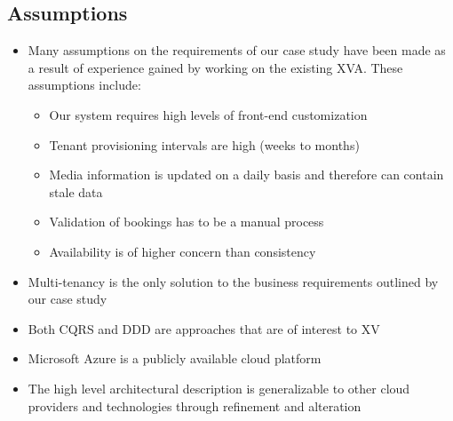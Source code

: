 \subsection{Assumptions}
\begin{itemize}
\item Many assumptions on the requirements of our case study have been made as a result of experience gained by working on the existing XVA. These assumptions include:
    \begin{itemize}
    \item Our system requires high levels of front-end customization
    \item Tenant provisioning intervals are high (weeks to months)
    \item Media information is updated on a daily basis and therefore can contain stale data
    \item Validation of bookings has to be a manual process
    \item Availability is of higher concern than consistency
    \end{itemize}
\item Multi-tenancy is the only solution to the business requirements outlined by our case study
\item Both CQRS and DDD are approaches that are of interest to XV
\item Microsoft Azure is a publicly available cloud platform
\item The high level architectural description is generalizable to other cloud providers and technologies through refinement and alteration
\end{itemize}

